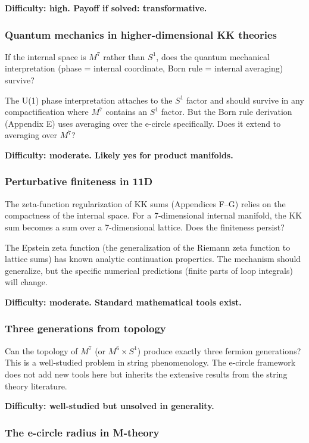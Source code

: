 \documentclass[aps,prd,preprint,superscriptaddress,longbibliography,floatfix]{revtex4-2}
\theoremstyle{remark}
\begin{document}
\textbf{Difficulty: high. Payoff if solved: transformative.}


\subsubsection{Quantum mechanics in higher-dimensional KK theories}

If the internal space is $M^7$ rather than $S^1$, does the quantum mechanical interpretation (phase = internal coordinate, Born rule = internal averaging) survive?

The U(1) phase interpretation attaches to the $S^1$ factor and should survive in any compactification where $M^7$ contains an $S^1$ factor. But the Born rule derivation (Appendix E) uses averaging over the e-circle specifically. Does it extend to averaging over $M^7$?

\textbf{Difficulty: moderate. Likely yes for product manifolds.}


\subsubsection{Perturbative finiteness in 11D}

The zeta-function regularization of KK sums (Appendices F--G) relies on the compactness of the internal space. For a 7-dimensional internal manifold, the KK sum becomes a sum over a 7-dimensional lattice. Does the finiteness persist?

The Epstein zeta function (the generalization of the Riemann zeta function to lattice sums) has known analytic continuation properties. The mechanism should generalize, but the specific numerical predictions (finite parts of loop integrals) will change.

\textbf{Difficulty: moderate. Standard mathematical tools exist.}


\subsubsection{Three generations from topology}

Can the topology of $M^7$ (or $M^6 \times S^1$) produce exactly three fermion generations? This is a well-studied problem in string phenomenology. The e-circle framework does not add new tools here but inherits the extensive results from the string theory literature.

\textbf{Difficulty: well-studied but unsolved in generality.}


\subsubsection{The e-circle radius in M-theory}
\end{document}
